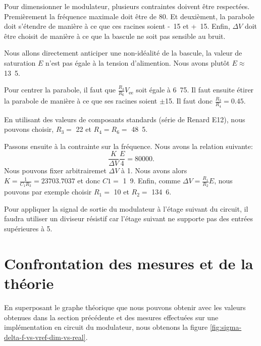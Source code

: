 Pour dimensionner le modulateur, plusieurs contraintes doivent
être respectées. Premièrement la fréquence maximale doit être
de \unit{80}{\kilo\hertz}. Et deuxièment, la parabole doit s'étendre
de manière à ce que ces racines soient \unit{-15}{\volt} et
\unit{+15}{\volt}. Enfin, $\Delta V$ doit être choisit de manière
à ce que la bascule ne soit pas sensible au bruit.

Nous allons directement anticiper une non-idéalité de la bascule,
la valeur de saturation $E$ n'est pas égale à la tension
d'alimention. Nous avons plutôt $E \approx$ \unit{13.5}{\volt}.

Pour centrer la parabole, il faut que $\frac{R_3}{R_6}V_{\text{ee}}$
soit égale à \unit{6.75}{\volt}. Il faut ensuite étirer la
parabole de manière à ce que ses racines soient $\pm$\unit{15}{\volt}.
Il faut donc $\frac{R_3}{R_4} = 0.45$. 

En utilisant des valeurs de composants standards (série de Renard E12), 
nous pouvons choisir, $R_3 =$ \unit{22}{\kilo\ohm} et $R_4 = R_6 =
$ \unit{48.5}{\kilo\ohm}.

Passons ensuite à la contrainte sur la fréquence. Nous avons la 
relation suivante:
\[ \frac{K}{\Delta V}\frac{E}{4} = 80000.\]
Nous pouvons fixer arbitrairemet $\Delta V$ à \unit{1}{\volt}. Nous avons alors
$K = \frac{1}{C_1R_3} = 23703.7037$ et donc $C1 =$ \unit{1.9}{\nano\farad}.
Enfin, comme $\Delta V = \frac{R_1}{R_2}E$, nous pouvons par exemple
choisir $R_1 =$ \unit{10}{\kilo\ohm} et $R_2 =$ \unit{134.6}{\kilo\ohm}.


Pour appliquer la signal de sortie du modulateur
à l'étage suivant du circuit, il faudra utiliser un diviseur
résistif car l'étage suivant ne supporte pas des entrées supérieures
à \unit{5}{\volt}.

\section{Confrontation des mesures et de la théorie}
En superposant le graphe théorique que nous pouvons obtenir avec les valeurs
obtenues dans la section précédente
et des mesures effectuées sur une implémentation en circuit
du modulateur, nous obtenons la figure \ref{fig:sigma-delta-f-vs-vref-dim-vs-real}.

